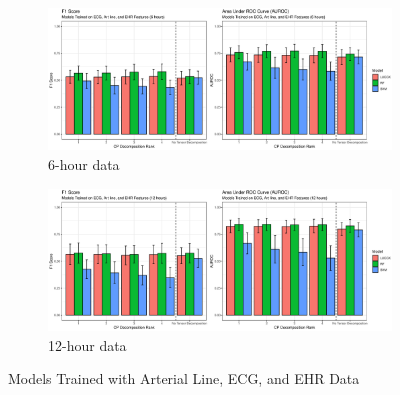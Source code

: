\begin{figure}[htb]
    \centering
    \begin{subfigure}[htb]{\textwidth}
        \includegraphics[width=\textwidth]{body/figures/all_6.eps}
        \caption{6-hour data}
    \end{subfigure}
    \hfill
    \begin{subfigure}[htb]{\textwidth}
        \includegraphics[width=\textwidth]{body/figures/all_12.eps}
        \caption{12-hour data}
    \end{subfigure}
    \caption{Models Trained with Arterial Line, ECG, and EHR Data}
    \label{fig:sigEHR}
\end{figure}  %

\clearpage